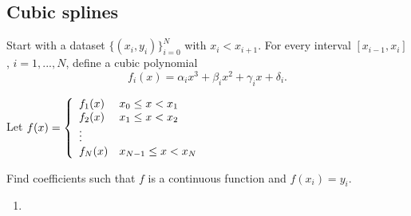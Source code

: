 \documentclass[12pt,letterpaper,noanswers]{exam}
\begin{document}
\subsection*{Cubic splines}
\begin{tcolorbox}
Start with a dataset $\{(x_i,y_i)\}_{i=0}^N$ with $x_i < x_{i+1}$.  For every interval $[x_{i-1},x_i]$, $i=1,...,N$, define a cubic polynomial \[f_i(x) = \alpha_i x^3 + \beta_i x^2 + \gamma_i x + \delta_i.\]

Let $f(x) = \left\{\begin{array}{l l} f_1(x) & x_0\leq x < x_1 \\
f_2(x) & x_1\leq x < x_2 \\
\vdots \\
f_N(x) & x_{N-1}\leq x < x_N \\
\end{array}\right.$

Find coefficients such that $f$ is a continuous function and $f(x_i) = y_i$.
\end{tcolorbox}
\begin{enumerate}[resume=classQ]
\item 
{}
\end{enumerate}
\end{document}
